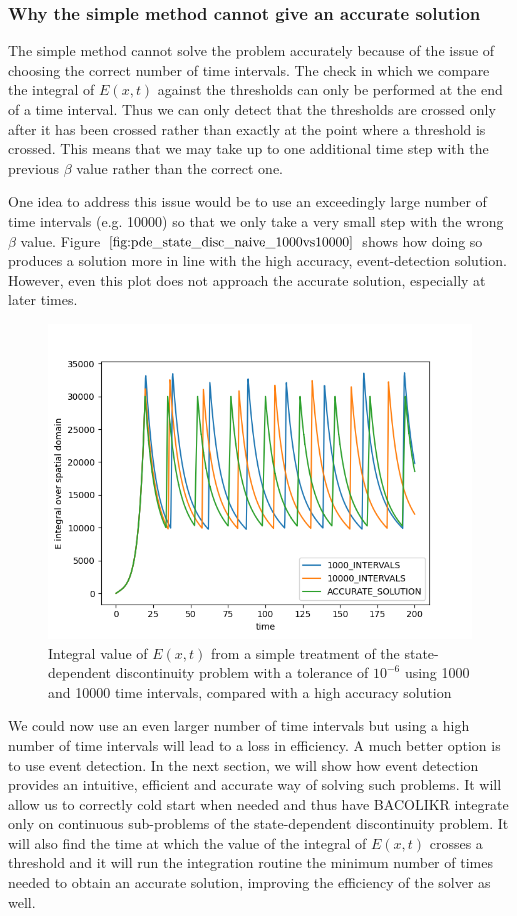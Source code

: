 \documentclass{article}
\begin{document}
\subsubsection{Why the simple method cannot give an accurate solution}
\label{subsubsection:pde_state_naive_always_inaccurate}
The simple method cannot solve the problem accurately because of the issue of choosing the correct number of time intervals. The check in which we compare the integral of $E(x, t)$ against the thresholds can only be performed at the end of a time interval. Thus we can only detect that the thresholds are crossed only after it has been crossed rather than exactly at the point where a threshold is crossed. This means that we may take up to one additional time step with the previous $\beta$ value rather than the correct one.

One idea to address this issue would be to use an exceedingly large number of time intervals (e.g. 10000) so that we only take a very small step with the wrong $\beta$ value. Figure $\ref{fig:pde_state_disc_naive_1000vs10000}$ shows how doing so produces a solution more in line with the high accuracy, event-detection solution. However, even this plot does not approach the accurate solution, especially at later times. 

\begin{figure}[H]
\centering
\includegraphics[width=0.7\linewidth]{./figures/pde_state_disc_naive_1000vs10000}
\caption{Integral value of $E(x, t)$ from a simple treatment of the state-dependent discontinuity problem with a tolerance of $10^{-6}$ using 1000 and 10000 time intervals, compared with a high accuracy solution}
\label{fig:pde_state_disc_naive_1000vs10000}
\end{figure}

We could now use an even larger number of time intervals but using a high number of time intervals will lead to a loss in efficiency. A much better option is to use event detection. In the next section, we will show how event detection provides an intuitive, efficient and accurate way of solving such problems. It will allow us to correctly cold start when needed and thus have BACOLIKR integrate only on continuous sub-problems of the state-dependent discontinuity problem. It will also find the time at which the value of the integral of $E(x, t)$ crosses a threshold and it will run the integration routine the minimum number of times needed to obtain an accurate solution, improving the efficiency of the solver as well.
\end{document}
